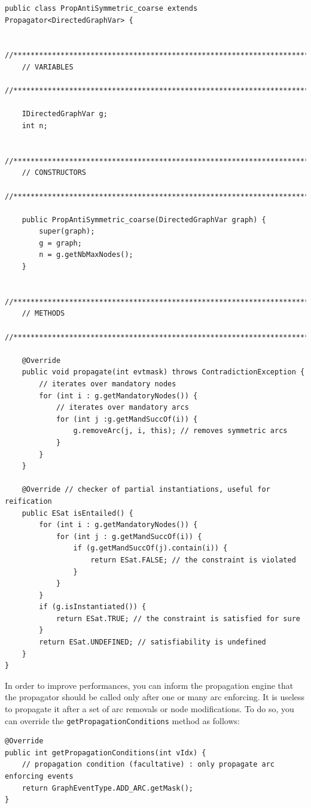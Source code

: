 \documentclass{article}
\begin{document}
\begin{lstlisting}
public class PropAntiSymmetric_coarse extends Propagator<DirectedGraphVar> {

    //*****************************************************************************
    // VARIABLES
    //*****************************************************************************

    IDirectedGraphVar g;
    int n;

    //*****************************************************************************
    // CONSTRUCTORS
    //*****************************************************************************

    public PropAntiSymmetric_coarse(DirectedGraphVar graph) {
        super(graph);
        g = graph;
        n = g.getNbMaxNodes();
    }

    //*****************************************************************************
    // METHODS
    //*****************************************************************************

    @Override
    public void propagate(int evtmask) throws ContradictionException {
        // iterates over mandatory nodes
        for (int i : g.getMandatoryNodes()) {
            // iterates over mandatory arcs
            for (int j :g.getMandSuccOf(i)) {
                g.removeArc(j, i, this); // removes symmetric arcs
            }
        }
    }

    @Override // checker of partial instantiations, useful for reification
    public ESat isEntailed() {
        for (int i : g.getMandatoryNodes()) {
            for (int j : g.getMandSuccOf(i)) {
                if (g.getMandSuccOf(j).contain(i)) {
                    return ESat.FALSE; // the constraint is violated
                }
            }
        }
        if (g.isInstantiated()) {
            return ESat.TRUE; // the constraint is satisfied for sure
        }
        return ESat.UNDEFINED; // satisfiability is undefined
    }
}
\end{lstlisting}

In order to improve performances, you can inform the propagation engine that the propagator should be called only after one or many arc enforcing. It is useless to propagate it after a set of arc removals or node modifications. 
To do so, you can override the \texttt{getPropagationConditions} method as follows:
\begin{lstlisting}
@Override
public int getPropagationConditions(int vIdx) {
	// propagation condition (facultative) : only propagate arc enforcing events
	return GraphEventType.ADD_ARC.getMask();
}
\end{lstlisting}
\end{document}
